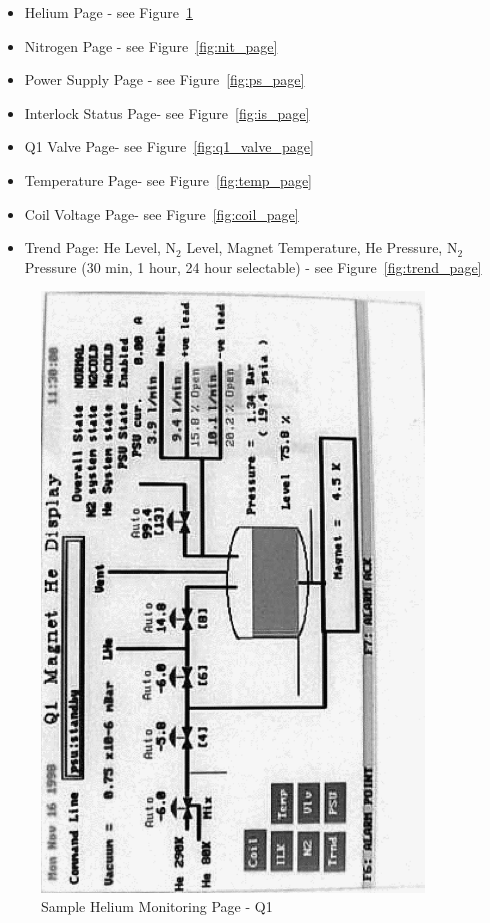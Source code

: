 {\begin{itemize}
\item{Helium Page - see Figure~\ref{fig:he_page}}
\item{Nitrogen Page - see Figure~\ref{fig:nit_page}}
\item{Power Supply Page - see Figure~\ref{fig:ps_page}}
\item{Interlock Status Page- see Figure~\ref{fig:is_page}}
\item{Q1 Valve Page- see Figure~\ref{fig:q1_valve_page}}
\item{Temperature Page- see Figure~\ref{fig:temp_page}}
\item{Coil Voltage Page- see Figure~\ref{fig:coil_page}}
\item{Trend Page: He Level, N$_2$ Level, Magnet Temperature, He Pressure,
N$_2$ Pressure (30 min, 1 hour, 24 hour selectable) - see Figure~\ref{fig:trend_page}}
\end{itemize}

\begin{center}

\begin{figure}
\includegraphics[angle=-90,width=4in]{Q1-helium}
\caption{Sample Helium Monitoring Page - Q1\label{fig:he_page}}
\end{figure}


\end{center}}

